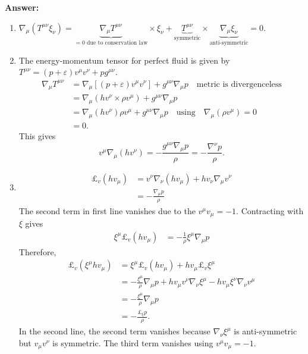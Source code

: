 \documentclass{article}
\begin{document}
\begin{enumerate}
{\bfseries Answer:}
\begin{enumerate}
\item $\nabla_\mu(T^{\mu\nu}\xi_\nu) = \underbrace{\nabla_\mu T^{\mu\nu}}_{=0\text{ due to conservation law}}\times\xi_\nu + \underbrace{T^{\mu\nu}}_{\text{symmetric}}\times\underbrace{\nabla_\mu \xi_\nu}_{\text{anti-symmetric}} = 0$.
\item The energy-momentum tensor for perfect fluid is given by $T^{\mu\nu} = (p+\varepsilon)v ^{\mu} v ^{\nu}  + p g ^{\mu\nu}$.
  \begin{align*}
    \nabla _{\mu} T ^{\mu\nu}
    & = \nabla _{\mu} [(p+\varepsilon)v ^{\mu} v^{\nu}] + g ^{\mu\nu}\nabla _{\mu} p\quad\text{metric is divergenceless}\\
    & = \nabla _{\mu} (h v ^{\nu}\times \rho v ^{\mu}) + g ^{\mu\nu} \nabla _{\mu} p\\
    & = \nabla _{\mu} (hv ^{\nu}) \rho v ^{\mu} + g ^{\mu\nu}\nabla_{\mu}p\quad\text{using}\quad\nabla _{\mu} (\rho v ^{\mu}) = 0\\
    & = 0.
  \end{align*}
  This gives
  \begin{equation}
    \label{eq:div-hv}
    \boxed{v^\mu\nabla_\mu(h v^\nu) = - \frac{g^{\mu\nu}\nabla_\mu p}{\rho} = - \frac{\nabla^\nu p}{\rho}.}
  \end{equation}
\item
  \begin{align*}
    \pounds_v (h v_\mu)
    & = v^\nu \nabla_\nu (h v_\mu) + h v_\nu \nabla_\mu v^\nu \\
    & = - \frac{\nabla_\mu p}{\rho}
  \end{align*}
  The second term in first line vanishes due to the $v^\mu v_\mu = -1$. Contracting with $\xi$ gives
  \begin{align*}
    \xi^\mu \pounds_v (hv_\mu)
    & = - \frac{1}{\rho}\xi^\mu\nabla_\mu p
  \end{align*}
  Therefore,
  \begin{align*}
    \pounds_v(\xi^\mu hv_\mu)
    & = \xi^\mu \pounds_v(h v_\mu) + h v_\mu \pounds_v \xi^\mu\\
    & = -\frac{\xi^\mu}{\rho}\nabla_\mu p + h v_\mu v^\nu\nabla_\nu \xi^\mu - hv_\mu \xi^\nu\nabla_\nu v^\mu\\
    & = -\frac{\xi^\mu}{\rho}\nabla_\mu p\\
    & = -\frac{\pounds_\xi p}{\rho}.
  \end{align*}
  In the second line, the second term vanishes because $\nabla_\nu\xi^\mu$ is anti-symmetric but $v_\mu v^\nu$ is symmetric. The third term vanishes using $v^\mu v_\mu = -1$.


\end{enumerate}
\end{enumerate}
\end{document}
